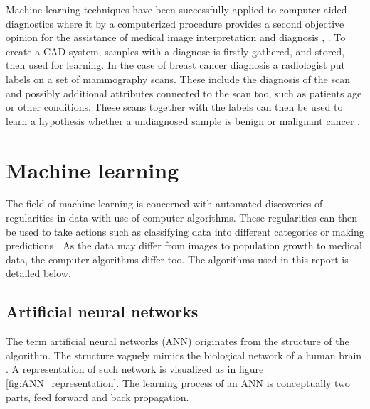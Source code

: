 Machine learning techniques have been successfully applied to computer aided diagnostics where it by a computerized procedure provides a second objective opinion for the assistance of medical image interpretation and diagnosis \parencite{li2007}, \parencite{ni2016}. To create a CAD system, samples with a diagnose is firstly gathered, and stored, then used for learning. In the case of breast cancer diagnosis a radiologist put labels on a set of mammography scans. These include the diagnosis of the scan and possibly additional attributes connected to the scan too, such as patients age or other conditions. These scans together with the labels can then be used to learn a hypothesis whether a undiagnosed sample is benign or malignant cancer \parencite{li2007}.


\section{Machine learning}

The field of machine learning is concerned with automated discoveries of regularities in data with use of computer algorithms. These regularities can then be used to take actions such as classifying data into different categories or making predictions \parencite{Bishop:2006}. As the data may differ from images to population growth to medical data, the computer algorithms differ too. The algorithms used in this report is detailed below.

\subsection{Artificial neural networks}

The term artificial neural networks (ANN) originates from the structure of the algorithm. The structure vaguely mimics the biological network of a human brain \parencite{Bishop:2006}. A representation of such network is visualized as in figure \ref{fig:ANN_representation}. The learning process of an ANN is conceptually two parts, feed forward and back propagation.

